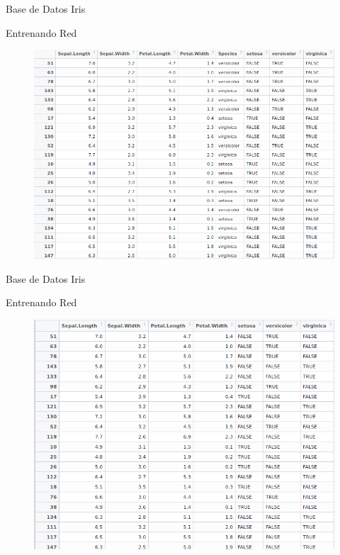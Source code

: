 \documentclass{beamer}
\begin{document}
\begin{frame}{Base de Datos Iris}
\begin{block}{Entrenando Red}
\begin{figure}
\includegraphics[scale=0.3]{irisespecie.png}
\centering
\end{figure}
\end{block}
\end{frame}

\begin{frame}{Base de Datos Iris}
\begin{block}{Entrenando Red}
\begin{figure}
\includegraphics[scale=0.3]{irisfalsetrue.png}
\centering
\end{figure}
\end{block}
\end{frame}
\end{document}
